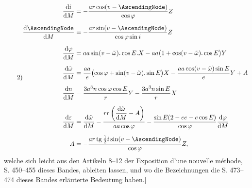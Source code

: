 \[
\tag*{2)}
\begin{aligned}
\frac{\mathrm{d}i}{\mathrm{d}M}
&=-\frac{ar\cos(v-\AscendingNode)}{\cos\varphi}Z\\[.6em]
\frac{\mathrm{d}\AscendingNode}{\mathrm{d}M}
&=-\frac{ar\sin(v-\AscendingNode)}{\cos\varphi\sin i}Z\\[.6em]
\frac{\mathrm{d}\varphi}{\mathrm{d}M}
&=aa\sin(v-\tilde\omega)\mathord{.}\cos E\mathord{.}X
 -aa\bigl(1+\cos(v-\tilde\omega)\mathord{.}\cos E\bigr)Y\\[.6em]
\frac{\mathrm{d}\tilde\omega}{\mathrm{d}M}
&=\frac{aa}{e}\bigl(\cos\varphi+\sin(v-\tilde\omega)\mathord{.}\sin E\bigr)X
 -\frac{aa\cos(v-\tilde\omega)\sin E}{e}Y+A\\[.6em]
\frac{\mathrm{d}n}{\mathrm{d}M}
&=\frac{3a^3n\cos\varphi\cos E}{r}Y-\frac{3a^3n\sin E}{r}X\\[.6em]
\frac{\mathrm{d}\varepsilon}{\mathrm{d}M}
&=\frac{\mathrm{d}\tilde\omega}{\mathrm{d}M}
 -\frac{rr\left(\dfrac{\mathrm{d}\tilde\omega}{\mathrm{d}M}-A\right)}{aa\cos\varphi}
 -\frac{\sin E(2-ee-e\cos E)}{\cos\varphi}\frac{\mathrm{d}\varphi}{\mathrm{d}M}\\[.6em]
A&=-\frac{ar\,\mathrm{tg}\,\tfrac{1}{2}i\sin(v-\AscendingNode)}{\cos\varphi}Z,
\end{aligned}
\]
welche sich leicht aus den Artikeln 8--12 der Exposition d'une nouvelle méthode, S. 450--455
dieses Bandes, ableiten lassen, und wo die Bezeichnungen die S. 473--474 dieses Bandes
erläuterte Bedeutung haben.]
\par\endgroup
\clearpage
\endgroup
